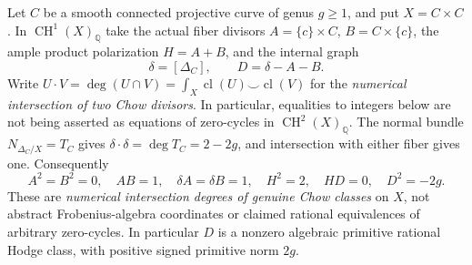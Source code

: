 \documentclass[11pt]{article}
\newcommand{\Q}{\mathbb Q}
\newcommand{\cl}{\operatorname{cl}}
\newcommand{\CH}{\operatorname{CH}}
\begin{document}
Let \(C\) be a smooth connected projective curve of genus
\(g\geq1\), and put \(X=C\times C\).
In \(\CH^1(X)_\Q\) take the actual fiber divisors
\(A=\{c\}\times C\), \(B=C\times\{c\}\), the ample
product polarization \(H=A+B\), and the internal graph
\[
  \delta=[\Delta_C],\qquad D=\delta-A-B.
\]
Write \(U\cdot V=\deg(U\cap V)=\int_X\cl(U)\smile\cl(V)\)
for the \emph{numerical intersection of two Chow divisors}.
In particular, equalities to integers below are not being asserted
as equations of zero-cycles in \(\CH^2(X)_\Q\).
The normal bundle \(N_{\Delta_C/X}=T_C\) gives
\(\delta\cdot\delta=\deg T_C=2-2g\), and intersection with
either fiber gives one. Consequently
\[
 A^2=B^2=0,\quad AB=1,\quad
 \delta A=\delta B=1,\quad
 H^2=2,\quad HD=0,\quad D^2=-2g.                  \tag{10}
\]
These are \emph{numerical intersection degrees of genuine Chow classes}
on \(X\), not abstract Frobenius-algebra coordinates or claimed
rational equivalences of arbitrary zero-cycles. In particular
\(D\) is a nonzero algebraic primitive rational Hodge class,
with positive signed primitive norm \(2g\).
\end{document}
